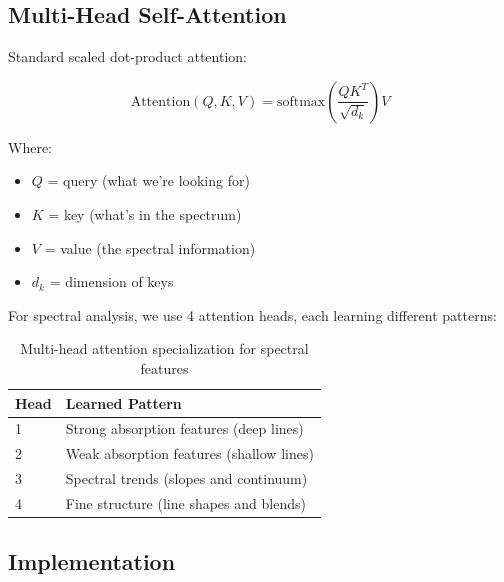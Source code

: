 \documentclass[12pt,a4paper,oneside]{report}
\begin{document}
\subsection{Multi-Head Self-Attention}

Standard scaled dot-product attention:

\begin{equation}
\text{Attention}(Q, K, V) = \text{softmax}\left(\frac{QK^T}{\sqrt{d_k}}\right)V
\label{eq:attention}
\end{equation}

Where:
\begin{itemize}
    \item $Q$ = query (what we're looking for)
    \item $K$ = key (what's in the spectrum)
    \item $V$ = value (the spectral information)
    \item $d_k$ = dimension of keys
\end{itemize}

For spectral analysis, we use 4 attention heads, each learning different patterns:

\begin{table}[H]
\centering
\begin{tabular}{|l|p{8cm}|}
\hline
\textbf{Head} & \textbf{Learned Pattern} \\
\hline
1 & Strong absorption features (deep lines) \\
2 & Weak absorption features (shallow lines) \\
3 & Spectral trends (slopes and continuum) \\
4 & Fine structure (line shapes and blends) \\
\hline
\end{tabular}
\caption{Multi-head attention specialization for spectral features}
\end{table}

\subsection{Implementation}
\end{document}
